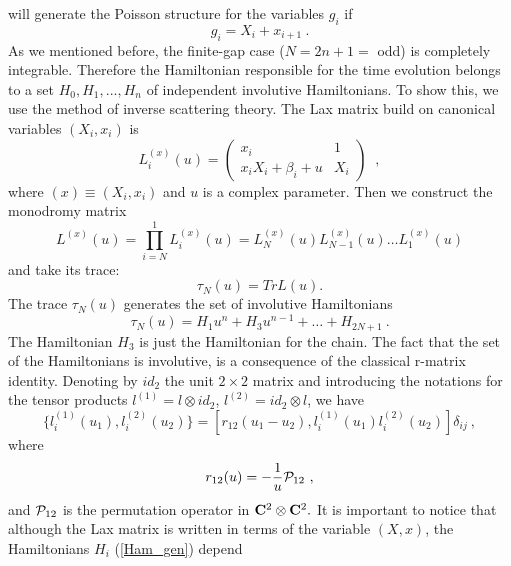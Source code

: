 \documentclass[a4paper,11pt]{article}
\begin{document}
will generate the Poisson structure for the variables $g_i$ if
\begin{equation}
\label{g_x}
g_i=X_i+x_{i+1}~.
\end{equation}
As we mentioned before, the finite-gap case ($N=2n+1=$ odd) is completely
integrable. Therefore the Hamiltonian responsible for the time evolution
belongs to a set $H_0,H_1,...,H_n$ of independent involutive Hamiltonians.
To show this, we use the method of inverse scattering theory. The Lax matrix
build on canonical variables $(X_i,x_i)$ is
\begin{equation}
\label{Lax1}
 L_i^{(x)}(u)=\left(\begin{array}{cc}
          x_i      & 1  \\
           x_iX_i+\beta_i+u      &  X_i
         \end{array}\right )\;\;,
\end{equation}
where $(x) \equiv (X_i,x_i)$ and $u$ is a complex parameter. Then we
construct the monodromy matrix
\begin{equation}
\label{monoL}
L^{(x)}(u)=\prod_{i=N}^{1} L^{(x)}_i(u)
                   =L^{(x)}_N(u) L^{(x)}_{N-1}(u) \ldots L^{(x)}_1(u)
\end{equation}
and take its trace:
\begin{equation}
\label{monod}
\tau _N(u)=Tr L(u).
\end{equation}
The trace $\tau_N(u)$ generates the set of involutive Hamiltonians
\begin{equation}
\label{Ham_gen}
\tau _N(u)=H_1u^n+H_3u^{n-1}+ \dots +H_{2N+1} ~.
\end{equation}
The Hamiltonian $H_3$ is just the Hamiltonian for the chain. The fact that
the set of the Hamiltonians is involutive, is a consequence of the classical
r-matrix identity. Denoting by $id_2$ the unit $2\times 2$ matrix and
introducing the notations for the tensor products $l^{(1)}=l\otimes id_2$,
$l^{(2)}=id_2\otimes l$, we have
\begin{equation}
\label{r-matrix}
 \{l_i^{(1)}(u_1),l_i^{(2)}(u_2)\}
               =[r_{12}(u_1-u_2),l_i^{(1)}(u_1)l_i^{(2)}(u_2)]\delta_{ij}~,
\end{equation}
where
\begin{equation}
\label{r}
r_{12}(u)=-\frac{1}{u}{\cal P}_{12}~,
\end{equation}
and ${\cal P}_{12}$ is the permutation operator in ${\bf C}^2\otimes {\bf
C}^2.$ It is important to notice that although the Lax matrix is written in
terms of the variable $(X,x)$, the Hamiltonians $H_i$ (\ref{Ham_gen}) depend
\end{document}
